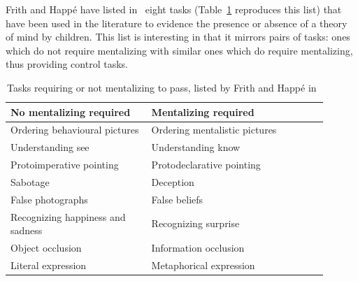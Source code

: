 \documentclass{sig-alternate}
\begin{document}
Frith and Happé have listed in~\cite{frith1994autism} eight tasks
(Table~\ref{mentalizing-tasks} reproduces this list) that have been
used in the literature to evidence the presence or absence of a theory of mind
by children. This list is interesting in that it mirrors pairs of tasks: ones
which do not require mentalizing with similar ones which do require mentalizing,
thus providing control tasks.

\begin{table}[h]
    \centering
    \begin{tabular}{p{0.4\linewidth}p{0.5\linewidth}}
        \toprule
        No mentalizing required           & Mentalizing required          \\
        \midrule
        Ordering behavioural pictures     & Ordering mentalistic pictures~\cite{baron1986mechanical} \\
        Understanding see                 & Understanding know~\cite{perner1989exploration}            \\
        Protoimperative pointing          & Protodeclarative pointing~\cite{baron1989perceptual}     \\
        Sabotage                          & Deception~\cite{sodian1992deception}                     \\
        False photographs                 & False beliefs~\cite{leslie1992domain}                 \\
        Recognizing happiness and sadness & Recognizing surprise~\cite{baron1993children}          \\
        Object occlusion                  & Information occlusion~\cite{baron1992out}         \\
        Literal expression                & Metaphorical expression~\cite{happe1993communicative}       \\
        \bottomrule
    \end{tabular}
    \caption{Tasks requiring or not mentalizing to pass, listed by Frith and Happé in~\cite{frith1994autism}}
    \label{mentalizing-tasks}
\end{table}
\end{document}
